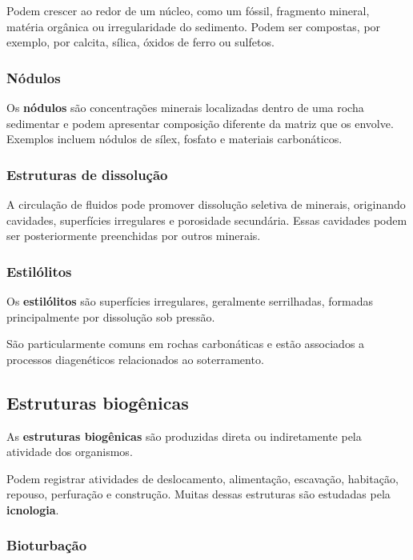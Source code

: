 Podem crescer ao redor de um núcleo, como um fóssil, fragmento mineral, matéria
orgânica ou irregularidade do sedimento. Podem ser compostas, por exemplo, por
calcita, sílica, óxidos de ferro ou sulfetos.

\subsubsection{Nódulos}

Os \textbf{nódulos} são concentrações minerais localizadas dentro de uma rocha
sedimentar e podem apresentar composição diferente da matriz que os envolve.
Exemplos incluem nódulos de sílex, fosfato e materiais carbonáticos.

\subsubsection{Estruturas de dissolução}

A circulação de fluidos pode promover dissolução seletiva de minerais,
originando cavidades, superfícies irregulares e porosidade secundária. Essas
cavidades podem ser posteriormente preenchidas por outros minerais.

\subsubsection{Estilólitos}

Os \textbf{estilólitos} são superfícies irregulares, geralmente serrilhadas,
formadas principalmente por dissolução sob pressão.

São particularmente comuns em rochas carbonáticas e estão associados a
processos diagenéticos relacionados ao soterramento.

\subsection{Estruturas biogênicas}

As \textbf{estruturas biogênicas} são produzidas direta ou indiretamente pela
atividade dos organismos.

Podem registrar atividades de deslocamento, alimentação, escavação, habitação,
repouso, perfuração e construção. Muitas dessas estruturas são estudadas pela
\textbf{icnologia}.

\subsubsection{Bioturbação}

